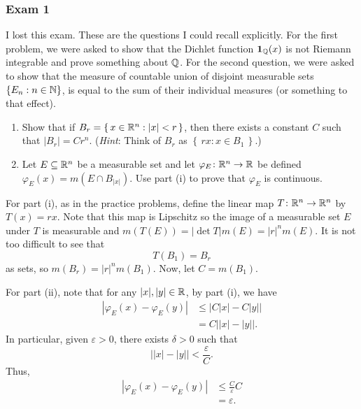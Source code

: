 \subsubsection{Exam 1}
\setcounter{exercise}{0}
\setcounter{equation}{0}

I lost this exam. These are the questions I could recall explicitly. For
the first problem, we were asked to show that the Dichlet function
\(\operatorname{\mathbf{1}}_{\mathbb{Q}}(x)\) is not Riemann integrable and prove something about
\(\mathbb{Q}\). For the second question, we were asked to show that the measure
of countable union of disjoint measurable sets \(\{E_n:n\in\mathbb{N}\}\), is
equal to the sum of their individual measures (or something to that
effect).
\begin{problem}
\end{problem}

\begin{problem}
\end{problem}

\begin{problem}
\hfill
\begin{enumerate}[label=(\roman*)]
\item Show that if \(B_r=\left\{\,x\in\mathbb{R}^n:|x|<r\,\right\}\), then there
  exists a constant \(C\) such that \(|B_r|=Cr^n\). (\emph{Hint}: Think of
  \(B_r\) as \(\left\{\,rx:x\in B_1\,\right\}\).)
\item Let \(E\subseteq\mathbb{R}^n\) be a measurable set and let
  \(\varphi_E\colon\mathbb{R}^n\to\mathbb{R}\) be defined
  \(\varphi_E(x)=m(E\cap B_{|x|})\). Use part (i) to prove that
  \(\varphi_E\) is continuous.
\end{enumerate}
\end{problem}
\begin{solution}
  For part (i), as in the practice problems, define the linear map
  \(T\colon\mathbb{R}^n\to\mathbb{R}^n\) by \(T(x)=rx\). Note that this map is
  Lipschitz so the image of a measurable set \(E\) under \(T\) is
  measurable and \(m(T(E))=|{\det T}|m(E)=|r|^nm(E)\). It is not too
  difficult to see that
  \[
    T(B_1)=B_r
  \]
  as sets, so \(m(B_r)=|r|^nm(B_1)\). Now, let \(C=m(B_1)\).

  For part (ii), note that for any \(|x|,|y|\in\mathbb{R}\), by part (i), we have
  \begin{align*}
    |\varphi_E(x)-\varphi_E(y)|
    &\leq\bigr|C|x|-C|y|\bigl|\\
    &=C\bigl||x|-|y|\bigr|.
  \end{align*}
  In particular, given \(\varepsilon>0\), there exists \(\delta>0\) such
  that
  \[
    \bigl||x|-|y|\bigr|<\frac{\varepsilon}{C}.
  \]
  Thus,
  \begin{align*}
    |\varphi_E(x)-\varphi_E(y)|
    &\leq \frac{C}{\varepsilon}{C}\\
    &=\varepsilon.
  \end{align*}
\end{solution}

